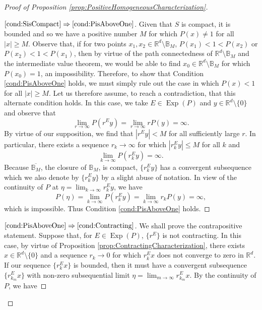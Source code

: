 \documentclass[11pt]{article}
\theoremstyle{remark}
\newcommand*{\myproofname}{Proof}
\newenvironment{subproof}[1][\myproofname]{\begin{proof}[#1]\renewcommand*{\qedsymbol}{$\mathbin{/\mkern-6mu/}$}}{\end{proof}}
\newcommand\Exp{\operatorname{Exp}}
\begin{document}
\begin{proof}[Proof of Proposition \ref{prop:PositiveHomogeneousCharacterization}]
\begin{subproof}[$\ref{cond:SisCompact}\Rightarrow\ref{cond:PisAboveOne}$]
Given that $S$ is compact, it is bounded and so we have a positive number $M$ for which $P(x)\neq 1$ for all $|x|\geq M$. Observe that, if for two points $x_1,x_2\in \mathbb{R}^d\setminus\mathbb{B}_M$, $P(x_1)<1<P(x_2)$ or $P(x_2)<1<P(x_1)$, then by virtue of the path connectedness of $\mathbb{R}^d\setminus\mathbb{B}_M$ and the intermediate value theorem, we would be able to find  $x_0\in\mathbb{R}^d\setminus\mathbb{B}_M$ for which $P(x_0)=1$, an impossibility. Therefore, to show that Condition \ref{cond:PisAboveOne} holds, we must simply rule out the case in which $P(x)<1$ for all $|x|\geq M$. Let us therefore assume, to reach a contradiction, that this alternate condition holds. In this case, we take $E\in\Exp(P)$ and $y\in\mathbb{R}^d\setminus \{0\}$ and observe that
\begin{equation*}
\lim_{r\to\infty}P(r^Ey)=\lim_{r\to\infty}rP(y)=\infty.
\end{equation*}
By virtue of our supposition, we find that $|r^Ey|<M$ for all sufficiently large $r$. In particular, there exists a sequence $r_k\to\infty$ for which $|r_k^Ey|\leq M$ for all $k$ and 
\begin{equation*}
\lim_{k\to\infty}P(r_k^Ey)=\infty.
\end{equation*}
Because $\overline{\mathbb{B}_M}$, the closure of $\mathbb{B}_M$, is compact, $\{r_k^Ey\}$ has a convergent subsequence which we also denote by $\{r_k^Ey\}$ by a slight abuse of notation. In view of the continuity of $P$ at $\eta=\lim_{k\to\infty}r_k^Ey$, we have
\begin{equation*}
P(\eta)=\lim_{k\to\infty}P(r_k^Ey)=\lim_{k\to\infty}r_kP(y)=\infty,
\end{equation*}
which is impossible. Thus Condition \ref{cond:PisAboveOne} holds.
\end{subproof}
\begin{subproof}[$\ref{cond:PisAboveOne}\Rightarrow\ref{cond:Contracting}$]
We shall prove the contrapositive statement. Suppose that, for $E\in\Exp(P)$, $\{r^E\}$ is not contracting. In this case, by virtue of Proposition \ref{prop:ContractingCharacterization}, there exists $x\in\mathbb{R}^d\setminus\{0\}$ and a sequence $r_k\to 0$ for which $r_k^Ex$ does not converge to zero in $\mathbb{R}^d$. If our sequence $\{r_k^Ex\}$ is bounded, then it must have a convergent subsequence $\{r_{k_m}^Ex\}$ with non-zero subsequential limit $\eta=\lim_{m\to\infty}r_{k_m}^Ex$. By the continuity of $P$, we have

\end{subproof}
\end{proof}
\end{document}
